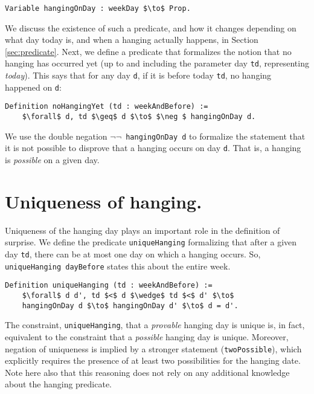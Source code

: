 \documentclass[runningheads]{llncs}
\begin{document}
\begin{lstlisting}[mathescape=true]
  Variable hangingOnDay : weekDay $\to$ Prop.
\end{lstlisting}

We discuss the existence of such a predicate, and how it changes depending
on what day today is, and when a hanging actually happens, in Section \ref{sec:predicate}.
Next, we define a predicate that formalizes the notion that no hanging has occurred
yet (up to and including the parameter day {\tt td}, representing \emph{today}).
This says that for any day {\tt d}, if it is before today {\tt td}, no hanging
happened on {\tt d}:

\begin{lstlisting}[mathescape=true]
  Definition noHangingYet (td : weekAndBefore) :=
    $\forall$ d, td $\geq$ d $\to$ $\neg $ hangingOnDay d.
\end{lstlisting}

We use the double negation {\tt $\neg \neg$ hangingOnDay d} to formalize the statement that it is
not possible to disprove that a hanging occurs on day {\tt d}. That is, a hanging
is \emph{possible} on a given day.

\section{Uniqueness of hanging. }
\label{sec:unique}

Uniqueness of the hanging day plays an important role in the definition of surprise.
We define the predicate {\tt uniqueHanging} formalizing that after a given day {\tt td},
there can be at most one day on which a hanging occurs. So,
{\tt uniqueHanging dayBefore} states this about the entire week.

\begin{lstlisting}[mathescape=true]
  Definition uniqueHanging (td : weekAndBefore) :=
    $\forall$ d d', td $<$ d $\wedge$ td $<$ d' $\to$
    hangingOnDay d $\to$ hangingOnDay d' $\to$ d = d'.
\end{lstlisting}

The constraint, {\tt uniqueHanging}, that
a \emph{provable} hanging day is unique is, in fact, equivalent to the constraint
that a \emph{possible} hanging day is unique. Moreover, negation of uniqueness
is implied by a stronger statement ({\tt twoPossible}), which explicitly
requires the presence of at least two possibilities for the hanging date.
Note here also that this reasoning does not rely on any additional knowledge about
the hanging predicate.
\end{document}
